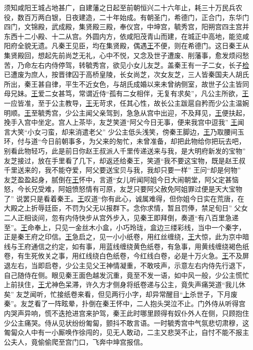 \documentclass[UTF8]{ctexart}
\begin{document}
须知咸阳王城占地甚广，自建藩之日起至前朝恒兴二十六年止，耗三十万民兵农役，数百万两白银，日夜建造，二十年始成。有朝圣门，希德门，正合门，东华门四门，文锦殿，武成殿，集贤殿三殿，奉仪宫，中坤宫，毓秀宫，阳朔宫四主宫并东西十二小殿、十二从宫。外圆内方，依咸阳茂青山而建，在城正中高地，能览咸阳府全貌无遗。凡秦王见臣，均在集贤殿，偶遇\uline{王}不便，则在希德门。这日秦王从集贤殿回，想起先前尚芝无礼，心中不悦，又念及世子遭废、削藩事，愈发烦闷愁苦，乃命左右内侍停驾，转毓秀宫，欲见小女儿友芝。盖秦王有一子二女，长子\uline{检}已遭废为庶人，按晋律囚于高桥皇陵，长女尚芝，次女友芝，三人皆秦国夫人胡氏所出，秦王甚自律，平生不近女色，与胡氏成婚以来未曾纳侧室，故世子公主皆同母兄妹。\uline{王}爱二女甚笃，常谓近侍“孤有二女相伴，无复有求矣”，凡公主所欲，\uline{王}一应皆准，至于公主教导，\uline{王}无苛求，任其心性，故长公主跋扈自矜而少公主温婉明顺。\uline{王}至毓秀宫，少公主闻父亲驾到，急急从宫中出迎，不及拜见，\uline{王}便扶起，挽手入宫中坐定。宫人上茶毕，友芝笑道“阿父今日无事，便来我宫中逗我” \uline{王}闻言大笑“小女刁蛮，却来消遣老父” 少公主低头浅笑，傍秦王脚边，\uline{王}乃取腰间玉环，付与道“今日前朝事多，为父来的匆忙，未曾准备，却把此物给你把玩去吧，别看此物轻巧，此是前日你赵王叔派人千里传递送来与我，是大明府新发的宝物” 友芝接过，放在手里看了几下，却返还给秦王，笑道“我不要这宝物，既是赵王叔千里送来的，我不能夺爱，阿父要送宝贝与我，我却只要一样” 王问“却是何物” 友芝盈盈起身，腻倒在\uline{王}怀中，言道“女儿听闻阿姐今日大闹朝堂，阿父定甚恼怒，今长兄受难，阿姐愤怒情有可原，友芝只要阿父赦免阿姐罪过便是天大宝物了” 说罢只是看着秦王。\uline{王}叹道“你有此心，诚属难得，但你姐今日实在荒唐，在大殿之上折辱廷臣，不罚为父无以报群下。念你求情，暂且罚俸，禁足旬日”  父女二人正相谈间，忽有内侍快步从宫外步入，见秦王即拜倒，奏道“有八百里急递至”。\uline{王}命奉上，只见一金丝木小盒，小巧玲珑，盒边三缕彩线，当中一个秦字，正是秦王府之印信。\uline{王}急启之，见一小小纸卷，用红丝缠绕，\uline{王}大惊，此为京中暗线与王府通信之约定，如有事，用蓝线缠绕黄色纸卷，有急事，用黄线缠绕褐色纸卷，有生死攸关之事，用红线绕白色纸卷，今红线白卷，必是十万火急。\uline{王}不及屏退左右，当即启卷，少公主见父王神情凝重，不敢吱声，示意左右内侍先行退下，自己随侍在侧。眼见秦王面色越发沉重，竟至不发一语，如中风一般，少公主慌忙上前扶住，\uline{王}尤神色呆滞，许久方才侧身将纸卷递与公主，竟失声痛哭道“我儿休矣” 友芝闻听，忙接纸卷来看，但见两行小字，却异常醒目“\uline{上}杀世子，下月废秦”。友芝看了一阵眩晕，扑倒在秦王怀中，二人抱头哭泣不止。门外侍从听得宫内哭声异响，慌不迭抢进宫来护驾，秦王此时哪里顾得有奴仆外人在侧，只顾抱住少公主痛哭。侍从见状纷纷匍匐，颤抖不敢言语。一时毓秀宫中气氛悲切肃穆，这匍匐众人中有一小厮唤作徐闯的，见无人敢动，二主又悲哭不止，自忖不能不报主公夫人，竟偷偷爬至宫门口，飞奔中坤宫报信。 
\end{document}
